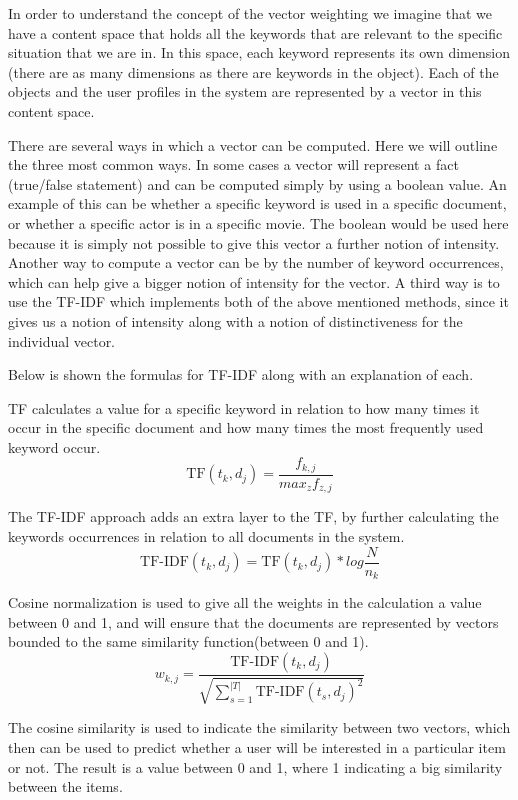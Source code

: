 In order to understand the concept of the vector weighting we imagine that we have a content space that holds all the keywords that are relevant to the specific situation that we are in. In this space, each keyword represents its own dimension (there are as many dimensions as there are keywords in the object). Each of the objects and the user profiles in the system are represented by a vector in this content space.

There are several ways in which a vector can be computed. Here we will outline the three most common ways.
In some cases a vector will represent a fact (true/false statement) and can be computed simply by using a boolean value. An example of this can be whether a specific keyword is used in a specific document, or whether a specific actor is in a specific movie. The boolean would be used here because it is simply not possible to give this vector a further notion of intensity.\newline
Another way to compute a vector can be by the number of keyword occurrences, which can help give a bigger notion of intensity for the vector.\newline
A third way is to use the TF-IDF which implements both of the above mentioned methods, since it gives us a notion of intensity along with a notion of distinctiveness for the individual vector.\newline

Below is shown the formulas for TF-IDF along with an explanation of each.

TF calculates a value for a specific keyword in relation to how many times it occur in the specific document and how many times the most frequently used keyword occur.
\[
	\text{TF}(t_{k},d_{j}) = \frac{f_{k,j}}{max_{z}f_{z,j}}
\]

The TF-IDF approach adds an extra layer to the TF, by further calculating the keywords occurrences in relation to all documents in the system.
\[
	\text{TF-IDF}(t_{k},d_{j}) = \text{TF}(t_{k},d_{j}) * log{\frac{N}{n_{k}}}
\]

Cosine normalization is used to give all the weights in the calculation a value between 0 and 1, and will ensure that the documents are represented by vectors bounded to the same similarity function(between 0 and 1).
\[
	w_{k,j} = \frac{\text{TF-IDF}(t_{k},d_{j})}{\sqrt{\sum_{s=1}^{|T|} \text{TF-IDF}(t_{s}, d_{j})^2}}
\]

The cosine similarity is used to indicate the similarity between two vectors, which then can be used to predict whether a user will be interested in a particular item or not. The result is a value between 0 and 1, where 1 indicating a big similarity between the items.

